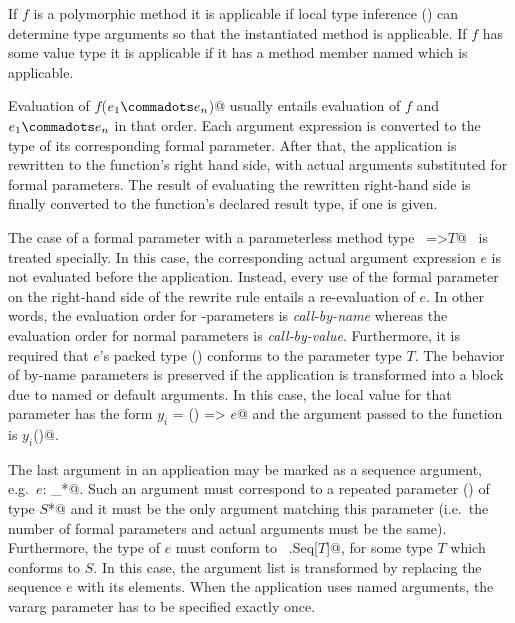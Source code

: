 If $f$ is a polymorphic method it is applicable if local type
inference () can
determine type arguments so that the instantiated method is applicable. If
$f$ has some value type it is applicable if it has a method member named
 which is applicable.



Evaluation of \lstinline@$f$($e_1 \commadots e_n$)@ usually entails evaluation of
$f$ and $e_1 \commadots e_n$ in that order. Each argument expression
is converted to the type of its corresponding formal parameter.  After
that, the application is rewritten to the function's right hand side,
with actual arguments substituted for formal parameters.  The result
of evaluating the rewritten right-hand side is finally converted to
the function's declared result type, if one is given.

The case of a formal parameter with a parameterless
method type ~\lstinline@=>$T$@~ is treated specially. In this case, the
corresponding actual argument expression $e$ is not evaluated before the
application. Instead, every use of the formal parameter on the
right-hand side of the rewrite rule entails a re-evaluation of $e$. 
In other words, the evaluation order for
\code{=>}-parameters is {\em call-by-name} whereas the evaluation
order for normal parameters is {\em call-by-value}.
Furthermore, it is required that $e$'s packed type ()
conforms to the parameter type $T$.
The behavior of by-name parameters is preserved if the application is
transformed into a block due to named or default arguments. In this case,
the local value for that parameter has the form \lstinline@val $y_i$ = () => $e$@
and the argument passed to the function is \lstinline@$y_i$()@.

The last argument in an application may be marked as a sequence
argument, e.g.\ \lstinline@$e$: _*@. Such an argument must correspond
to a repeated parameter () of type
\lstinline@$S$*@ and it must be the only argument matching this
parameter (i.e.\ the number of formal parameters and actual arguments
must be the same). Furthermore, the type of $e$ must conform to
~\lstinline@scala.Seq[$T$]@, for some type $T$ which conforms to
$S$. In this case, the argument list is transformed by replacing the
sequence $e$ with its elements. When the application uses named
arguments, the vararg parameter has to be specified exactly once.

